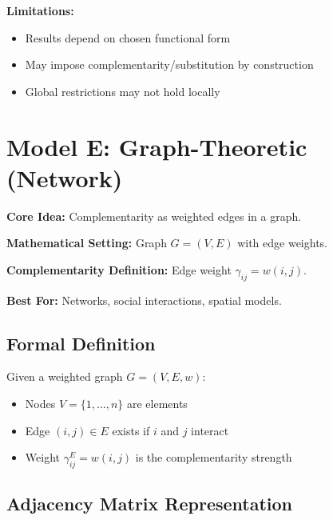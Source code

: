 \textbf{Limitations:}
\begin{itemize}
    \item Results depend on chosen functional form
    \item May impose complementarity/substitution by construction
    \item Global restrictions may not hold locally
\end{itemize}

\section{Model E: Graph-Theoretic (Network)}
\label{sec:model-e}

\begin{tcolorbox}[colback=green!5!white,colframe=green!75!black,title=\textbf{Model E Overview}]
\textbf{Core Idea:} Complementarity as weighted edges in a graph.

\textbf{Mathematical Setting:} Graph $G = (V, E)$ with edge weights.

\textbf{Complementarity Definition:} Edge weight $\gamma_{ij} = w(i, j)$.

\textbf{Best For:} Networks, social interactions, spatial models.
\end{tcolorbox}

\subsection{Formal Definition}

\begin{definition}
Given a weighted graph $G = (V, E, w)$:
\begin{itemize}
    \item Nodes $V = \{1, \ldots, n\}$ are elements
    \item Edge $(i, j) \in E$ exists if $i$ and $j$ interact
    \item Weight $\gamma^E_{ij} = w(i, j)$ is the complementarity strength
\end{itemize}
\end{definition}

\subsection{Adjacency Matrix Representation}

